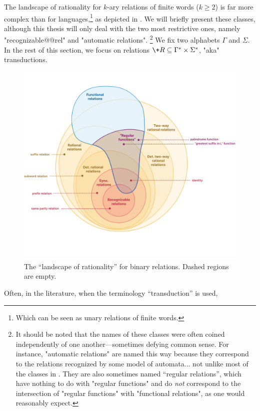 The landscape of rationality for $k$-ary relations of finite words ($k \geq 2$) is far more complex than for languages,\footnote{Which can be seen as unary relations of finite words.} as depicted in . We will briefly present these classes,
although this thesis will only deal with the two most restrictive ones, namely
"recognizable@@rel" and "automatic relations".%
\footnote{It should be noted that the names
of these classes were often coined independently of one another---sometimes defying common sense.
For instance, "automatic relations" are named this way because they correspond to
the relations recognized by some model of automata...
not unlike most of the classes in .
They are also sometimes named ``regular relations'', which have nothing to do
with "regular functions" and do \emph{not} correspond to the intersection of "regular functions"
with "functional relations", as one would reasonably expect.}
We fix two alphabets $\Gamma$ and $\Sigma$. In the rest of this section, we focus
on relations $\+R \subseteq \Gamma^* \times \Sigma^*$, "aka" transductions.
\begin{figure}
	\centering
	\includegraphics[width=\linewidth]{fig/landscape-rationality-relations.png}
	\caption{
		\AP\label{fig:landscape-rationality-relations}
		The ``landscape of rationality'' for binary relations.
		Dashed regions are empty.
	}
\end{figure}
Often, in the literature, when the terminology ``transduction'' is used,
